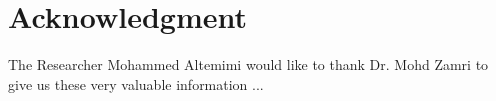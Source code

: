 \documentclass[conference, compsoc]{IEEEtran}
\begin{document}
\section*{Acknowledgment}
The Researcher Mohammed Altemimi would like to thank Dr. Mohd Zamri to give us these very valuable information ...



%
%
%
\end{document}
